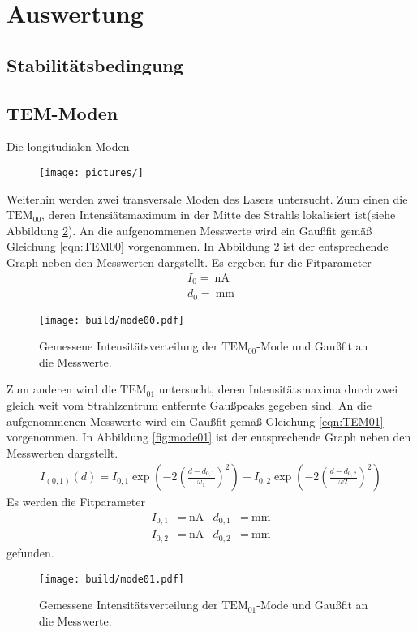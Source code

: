 \section{Auswertung}
\label{sec:Auswertung}



\subsection{Stabilitätsbedingung}
\label{subsec:Stabil}



\subsection{TEM-Moden}
\label{subsec:tem}
Die longitudialen Moden

\begin{figure}
  \texttt{[image: pictures/]}
  \caption{}
  \label{}
\end{figure}


Weiterhin werden zwei transversale Moden des Lasers untersucht.
Zum einen die \textbf{$\text{TEM}_{00}$},
deren Intensiätsmaximum in der Mitte des Strahls lokalisiert ist(siehe Abbildung \ref{fig:mode00}).
An die aufgenommenen Messwerte wird ein Gaußfit gemäß Gleichung \ref{eqn:TEM00} vorgenommen.
In Abbildung \ref{fig:mode00} ist der entsprechende Graph neben den Messwerten dargstellt.
Es ergeben für die Fitparameter
\begin{align}
  I_0=\SI{}{\nano\ampere}\\
  d_0=\SI{}{\milli\meter}
\end{align}
\begin{figure}
  \centering
  \texttt{[image: build/mode00.pdf]}
  \caption{Gemessene Intensitätsverteilung der \textbf{$\text{TEM}_{00}$}-Mode und Gaußfit an die Messwerte.}
  \label{fig:mode00}
\end{figure}

Zum anderen wird die \textbf{$\text{TEM}_{01}$} untersucht, deren Intensitätsmaxima durch
zwei gleich weit vom Strahlzentrum entfernte Gaußpeaks gegeben sind.
An die aufgenommenen Messwerte wird ein Gaußfit gemäß Gleichung \ref{eqn:TEM01} vorgenommen.
In Abbildung \ref{fig:mode01} ist der entsprechende Graph neben den Messwerten dargstellt.
\begin{align}
  I_{(0,1)}(d)=I_{0,1}\exp\left(-2\left(\frac{d-d_{0,1}}{\omega_1}\right)^2\right)+I_{0,2}\exp\left(-2\left(\frac{d-d_{0,2}}{\omega2}\right)^2\right) \label{eqn:TEM01asy}
\end{align}
Es werden die Fitparameter
 \begin{align}
   I_{0,1}&=\SI{}{\nano\ampere}&   d_{0,1}&=\SI{}{\milli\meter}\\
   I_{0,2}&=\SI{}{\nano\ampere}&   d_{0,2}&=\SI{}{\milli\meter}
 \end{align}
gefunden.
\begin{figure}
  \centering
  \texttt{[image: build/mode01.pdf]}
  \caption{Gemessene Intensitätsverteilung der \textbf{$\text{TEM}_{01}$}-Mode und Gaußfit an die Messwerte.}
  \label{fig:plot}
\end{figure}



